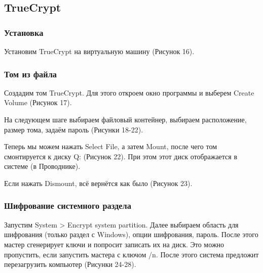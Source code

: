 \FloatBarrier
\clearpage

\subsection{TrueCrypt}
\subsubsection{Установка}

Установим TrueCrypt на виртуальную машину (Рисунок 16).

\FloatBarrier

\subsubsection{Том из файла}

Создадим том TrueCrypt. Для этого откроем окно программы и выберем Create Volume (Рисунок 17).

\FloatBarrier

На следующем шаге выбираем файловый контейнер, выбираем расположение, размер тома, задаём пароль (Рисунки 18-22).

\FloatBarrier

\FloatBarrier

\FloatBarrier

\FloatBarrier

Теперь мы можем нажать Select File, а затем Mount, после чего том смонтируется к диску Q: (Рисунок 22). При этом этот диск отображается в системе (в Проводнике).

\FloatBarrier

Если нажать Dismount, всё вернётся как было (Рисунок 23).

\FloatBarrier

\clearpage


\subsubsection{Шифрование системного раздела}

Запустим System > Encrypt system partition. Далее выбираем область для шифрования (только раздел с Windows), опции шифрования, пароль. После этого мастер сгенерирует ключи и попросит записать их на диск. Это можно пропустить, если запустить мастера с ключом /n. После этого система предложит перезагрузить компьютер (Рисунки 24-28).

